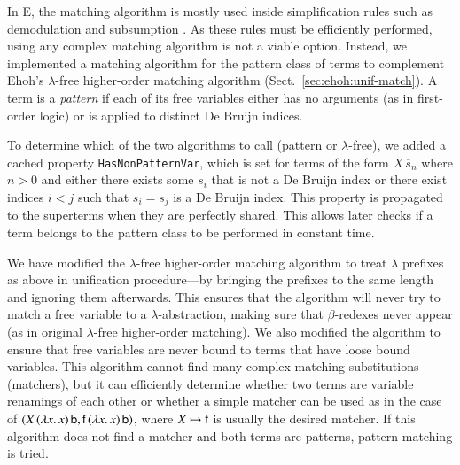 In E, the matching algorithm is mostly used inside
simplification rules such as demodulation and subsumption \cite{ss-02-brainiac}.
As these rules must be efficiently performed, using any complex matching
algorithm is not a viable option. Instead, we implemented a matching algorithm
for the pattern class of terms \cite{tn-93-patterns} to complement Ehoh's
$\lambda$-free higher-order matching algorithm (Sect.~\ref{sec:ehoh:unif-match}).
A term is a \emph{pattern} if each of its free variables either
has no arguments (as in first-order logic) or is applied to distinct De Bruijn
indices.

To determine which of the two algorithms to call (pattern or $\lambda$-free), we
added a cached property \texttt{HasNonPatternVar}, which is set for terms of the
form $X \,
\overline{s}_n$ where $n>0$ and either there exists some $s_i$ that is not a De Bruijn
index or there exist indices $i < j$ such that $s_i = s_j$ is
a De Bruijn index. This property is propagated to the superterms when they are
perfectly shared. This allows later checks if a term belongs to the pattern
class to be performed in constant time.


We have modified the $\lambda$-free higher-order matching algorithm to treat
$\lambda$ prefixes as above in unification procedure---by bringing the prefixes
to the same length and ignoring them afterwards. This ensures that the
algorithm will never try to match a free variable to a $\lambda$-abstraction,
making sure that $\beta$-redexes never appear (as in original $\lambda$-free
higher-order matching). We also modified the algorithm to ensure that free variables
are never bound to terms that have loose bound variables. This algorithm cannot
find many complex matching substitutions (matchers), but it can
efficiently determine whether two terms are variable renamings of each other
or whether a simple matcher can be used as in the case of $(X \, (\lambda x. \,x) \,
\mathsf{b}, \mathsf{f} \, (\lambda x. \,x) \, \mathsf{b})$, where ${X \mapsto \mathsf{f}}$ is
usually the desired matcher. If this algorithm does not find a matcher and both
terms are patterns, pattern matching is tried.

